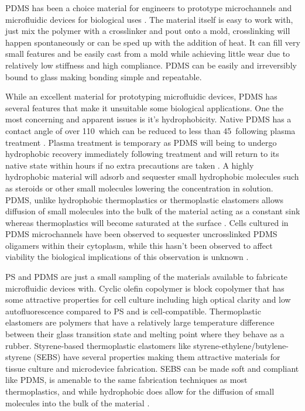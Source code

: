 PDMS has been a choice material for engineers to prototype microchannels and microfluidic devices for biological uses \cite{Sia2003a}. The material itself is easy to work with, just mix the polymer with a crosslinker and pout onto a mold, crosslinking will happen spontaneously or can be sped up with the addition of heat. It can fill very small features and be easily cast from a mold while achieving little wear due to relatively low stiffness and high compliance. PDMS can be easily and irreversibly bound to glass making bonding simple and repeatable. 

While an excellent material for prototyping microfluidic devices, PDMS has several features that make it unsuitable some biological applications. One the most concerning and apparent issues is it's hydrophobicity. Native PDMS has a contact angle of over 110\textdegree\, which can be reduced to less than 45\textdegree\ following plasma treatment \cite{Mata2005CharacterizationMicro/Nanosystems}. Plasma treatment is temporary as PDMS will being to undergo hydrophobic recovery immediately following treatment and will return to its native state within hours if no extra precautions are taken \cite{Eddington2006ThermalPolydimethylsiloxane}. A highly hydrophobic material will adsorb and sequester small hydrophobic molecules such as steroids or other small molecules lowering the concentration in solution. PDMS, unlike hydrophobic thermoplastics or thermoplastic elastomers allows diffusion of small molecules into the bulk of the material acting as a constant sink whereas thermoplastics will become saturated at the surface \cite{Toepke2006, Regehr2009,Borysiak2013b}. Cells cultured in PDMS microchannels have been observed to sequester uncrosslinked PDMS oligamers within their cytoplasm, while this hasn't been observed to affect viability the biological implications of this observation is unknown \cite{Regehr2009}.

PS and PDMS are just a small sampling of the materials available to fabricate microfluidic devices with. Cyclic olefin copolymer is block copolymer that has some attractive properties for cell culture including high optical clarity and low autofluorescence compared to PS and is cell-compatible\cite{Young2012, VanMidwoud2012}. Thermoplastic elastomers are polymers that have a relatively large temperature difference between their glass transition state and melting point where they behave as a rubber. Styrene-based thermoplastic elastomers like styrene-ethylene/butylene-styrene (SEBS) have several properties making them attractive materials for tissue culture and microdevice fabrication. SEBS can be made soft and compliant like PDMS, is amenable to the same fabrication techniques as most thermoplastics, and while hydrophobic does allow for the diffusion of small molecules into the bulk of the material \cite{Borysiak2013b, Borysiak2013,Roy2011,Guillemette2011,Guillemette2009,Li2013a}.

